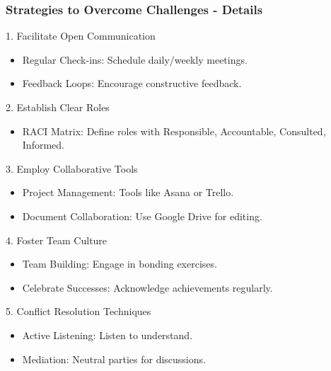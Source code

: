 \documentclass{beamer}
\begin{document}
\begin{frame}[fragile]
    \frametitle{Strategies to Overcome Challenges - Details}
    \begin{block}{1. Facilitate Open Communication}
        \begin{itemize}
            \item Regular Check-ins: Schedule daily/weekly meetings.
            \item Feedback Loops: Encourage constructive feedback.
        \end{itemize}
    \end{block}
    
    \begin{block}{2. Establish Clear Roles}
        \begin{itemize}
            \item RACI Matrix: Define roles with Responsible, Accountable, Consulted, Informed.
        \end{itemize}
    \end{block}
    
    \begin{block}{3. Employ Collaborative Tools}
        \begin{itemize}
            \item Project Management: Tools like Asana or Trello.
            \item Document Collaboration: Use Google Drive for editing.
        \end{itemize}
    \end{block}

    \begin{block}{4. Foster Team Culture}
        \begin{itemize}
            \item Team Building: Engage in bonding exercises.
            \item Celebrate Successes: Acknowledge achievements regularly.
        \end{itemize}
    \end{block}

    \begin{block}{5. Conflict Resolution Techniques}
        \begin{itemize}
            \item Active Listening: Listen to understand.
            \item Mediation: Neutral parties for discussions.
        \end{itemize}
    \end{block}
\end{frame}
\end{document}
